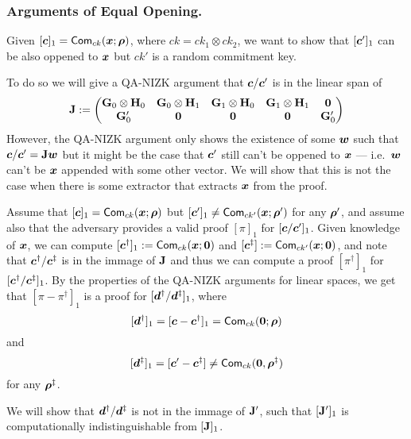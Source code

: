 \subsubsection{Arguments of Equal Opening.} Given $[{\boldsymbol{c}}]_1=\mathsf{Com}_{ck}({\boldsymbol{x}};{\boldsymbol{\rho}})$, where $ck = ck_1\otimes ck_2$, we want to show that $[{\boldsymbol{c}}']_1$ can be also oppened to ${\boldsymbol{x}}$ but $ck'$ is a random commitment key.

To do so we will give a QA-NIZK argument that ${\boldsymbol{c}}/{\boldsymbol{c}}'$ is in the linear span of
$$
\mathbf{{J}}:=
\begin{pmatrix}
\mathbf{{G}}_0\otimes\mathbf{{H}}_0 & \mathbf{{G}}_0\otimes\mathbf{{H}}_1 & \mathbf{{G}}_1\otimes\mathbf{{H}}_0& \mathbf{{G}}_1\otimes\mathbf{{H}}_1 & \mathbf{{0}}\\
\mathbf{{G}}'_0 & \mathbf{{0}} & \mathbf{{0}} & \mathbf{{0}} & \mathbf{{G}}'_0 
\end{pmatrix}
$$
However, the QA-NIZK argument only shows the existence of some ${\boldsymbol{w}}$ such that ${\boldsymbol{c}}/{\boldsymbol{c}}' = \mathbf{{J}}{\boldsymbol{w}}$ but it might be the case that ${\boldsymbol{c}}'$ still can't be oppened to ${\boldsymbol{x}}$ --- i.e.~${\boldsymbol{w}}$ can't be ${\boldsymbol{x}}$ appended with some other vector. We will show that this is not the case when there is some extractor that extracts ${\boldsymbol{x}}$ from the proof.

Assume that $[{\boldsymbol{c}}]_1 = \mathsf{Com}_{ck}({\boldsymbol{x}};{\boldsymbol{\rho}})$ but $[{\boldsymbol{c}}']_1\neq \mathsf{Com}_{ck'}({\boldsymbol{x}};{\boldsymbol{\rho}}')$ for any ${\boldsymbol{\rho}}'$, and assume also that the adversary provides a valid proof $[\pi]_1$ for $[{\boldsymbol{c}}/{\boldsymbol{c}}']_1$. Given knowledge of ${\boldsymbol{x}}$, we can compute $[{\boldsymbol{c}}^\dag]_1:=\mathsf{Com}_{ck}({\boldsymbol{x}};{\boldsymbol{0}})$ and $[{\boldsymbol{c}}^\ddag]:=\mathsf{Com}_{ck'}({\boldsymbol{x}};{\boldsymbol{0}})$, and note that ${\boldsymbol{c}}^\dag/{\boldsymbol{c}}^\ddag$ is in the immage of $\mathbf{{J}}$ and thus we can compute a proof $[\pi^\dag]_1$ for $[{\boldsymbol{c}}^\dag/{\boldsymbol{c}}^\ddag]_1$. By the properties of the QA-NIZK arguments for linear spaces, we get that $[\pi-\pi^\dag]_1$ is a proof for $[{\boldsymbol{d}}^\dag/{\boldsymbol{d}}^\ddag]_1$, where
$$[{\boldsymbol{d}}^\dag]_1=[{\boldsymbol{c}}-{\boldsymbol{c}}^\dag]_1= \mathsf{Com}_{ck}({\boldsymbol{0}};{\boldsymbol{\rho}})$$ and 
$$[{\boldsymbol{d}}^\ddag]_1 = [{\boldsymbol{c}}'-{\boldsymbol{c}}^\ddag]\neq\mathsf{Com}_{ck}({\boldsymbol{0}},{\boldsymbol{\rho}}^\ddag)$$ for any ${\boldsymbol{\rho}}^\ddag$.

We will show that ${\boldsymbol{d}}^\dag/ {\boldsymbol{d}}^\ddag$ is not in the immage of $\mathbf{{J}}'$, such that $[\mathbf{{J}}']_1$ is computationally indistinguishable from $[\mathbf{{J}}]_1$.

